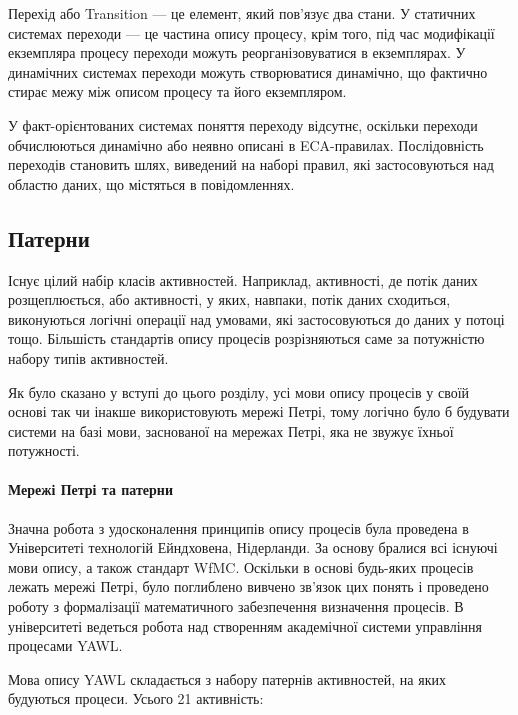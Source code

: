 \documentclass{memoir}
\begin{document}
Перехід або Transition — це елемент, який пов’язує два стани. У статичних системах переходи — це частина опису процесу, крім того, під час модифікації екземпляра процесу переходи можуть реорганізовуватися в екземплярах. У динамічних системах переходи можуть створюватися динамічно, що фактично стирає межу між описом процесу та його екземпляром.

У факт-орієнтованих системах поняття переходу відсутнє, оскільки переходи обчислюються динамічно або неявно описані в ECA-правилах. Послідовність переходів становить шлях, виведений на наборі правил, які застосовуються над областю даних, що містяться в повідомленнях.

\subsection{Патерни}

Існує цілий набір класів активностей. Наприклад, активності, де потік даних розщеплюється, або активності, у яких, навпаки, потік даних сходиться, виконуються логічні операції над умовами, які застосовуються до даних у потоці тощо. Більшість стандартів опису процесів розрізняються саме за потужністю набору типів активностей.

Як було сказано у вступі до цього розділу, усі мови опису процесів у своїй основі так чи інакше використовують мережі Петрі, тому логічно було б будувати системи на базі мови, заснованої на мережах Петрі, яка не звужує їхньої потужності.

\paragraph{Мережі Петрі та патерни}

Значна робота з удосконалення принципів опису процесів була проведена в Університеті технологій Ейндховена, Нідерланди. За основу бралися всі існуючі мови опису, а також стандарт WfMC. Оскільки в основі будь-яких процесів лежать мережі Петрі, було поглиблено вивчено зв’язок цих понять і проведено роботу з формалізації математичного забезпечення визначення процесів. В університеті ведеться робота над створенням академічної системи управління процесами YAWL.

Мова опису YAWL складається з набору патернів активностей, на яких будуються процеси. Усього 21 активність:
\end{document}
